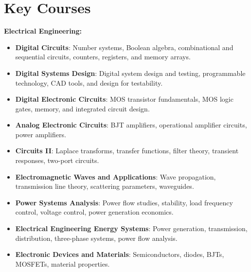 \documentclass[A4,10pt]{article}
\begin{document}
\section{Key Courses}
\begin{itemize}[leftmargin=0.05in, label={}]
    \small{
    \item \textbf{Electrical Engineering:}\\
    \begin{itemize}[leftmargin=0.15in, label={}]
        \item \textbf{Digital Circuits}{: Number systems, Boolean algebra, combinational and sequential circuits, counters, registers, and memory arrays.}\\
        \item \textbf{Digital Systems Design}{: Digital system design and testing, programmable technology, CAD tools, and design for testability.}\\
        \item \textbf{Digital Electronic Circuits}{: MOS transistor fundamentals, MOS logic gates, memory, and integrated circuit design.}\\
        \item \textbf{Analog Electronic Circuits}{: BJT amplifiers, operational amplifier circuits, power amplifiers.}\\
        \item \textbf{Circuits II}{: Laplace transforms, transfer functions, filter theory, transient responses, two-port circuits.}\\
        \item \textbf{Electromagnetic Waves and Applications}{: Wave propagation, transmission line theory, scattering parameters, waveguides.}\\
        \item \textbf{Power Systems Analysis}{: Power flow studies, stability, load frequency control, voltage control, power generation economics.}\\
        \item \textbf{Electrical Engineering Energy Systems}{: Power generation, transmission, distribution, three-phase systems, power flow analysis.}\\
        \item \textbf{Electronic Devices and Materials}{: Semiconductors, diodes, BJTs, MOSFETs, material properties.}\\
    \end{itemize}
    
}
\end{itemize}
\end{document}
